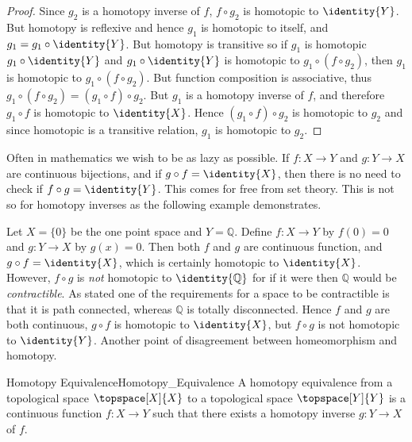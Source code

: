         \begin{proof}
            Since $g_{2}$ is a homotopy inverse of $f$,
            $f\circ{g}_{2}$ is homotopic to $\identity{Y}$. But homotopy
            is reflexive and hence $g_{1}$ is homotopic to itself, and
            $g_{1}=g_{1}\circ\identity{Y}$. But homotopy is transitive
            so if $g_{1}$ is homotopic $g_{1}\circ\identity{Y}$ and
            $g_{1}\circ\identity{Y}$ is homotopic to
            $g_{1}\circ(f\circ{g}_{2})$, then $g_{1}$ is homotopic to
            $g_{1}\circ(f\circ{g}_{2})$. But function composition is
            associative, thus
            $g_{1}\circ(f\circ{g}_{2})=(g_{1}\circ{f})\circ{g}_{2}$.
            But $g_{1}$ is a homotopy inverse of $f$, and therefore
            $g_{1}\circ{f}$ is homotopic to $\identity{X}$. Hence
            $(g_{1}\circ{f})\circ{g}_{2}$ is homotopic to ${g}_{2}$ and
            since homotopic is a transitive relation, $g_{1}$ is
            homotopic to ${g}_{2}$.
        \end{proof}
        Often in mathematics we wish to be as lazy as possible. If
        $f:X\rightarrow{Y}$ and $g:Y\rightarrow{X}$ are continuous
        bijections, and if $g\circ{f}=\identity{X}$, then there is no
        need to check if $f\circ{g}=\identity{Y}$. This comes for free
        from set theory. This is not so for homotopy inverses as the
        following example demonstrates.
        \begin{example}
            Let $X=\{0\}$ be the one point space and $Y=\mathbb{Q}$.
            Define $f:X\rightarrow{Y}$ by $f(0)=0$ and
            $g:Y\rightarrow{X}$ by $g(x)=0$. Then both $f$ and $g$ are
            continuous function, and $g\circ{f}=\identity{X}$, which is
            certainly homotopic to $\identity{X}$. However, $f\circ{g}$
            is \textit{not} homotopic to $\identity{\mathbb{Q}}$ for if
            it were then $\mathbb{Q}$ would be \textit{contractible}. As
            stated one of the requirements for a space to be contractible
            is that it is path connected, whereas $\mathbb{Q}$ is
            totally disconnected. Hence $f$ and $g$ are both continuous,
            $g\circ{f}$ is homotopic to $\identity{X}$, but
            $f\circ{g}$ is not homotopic to $\identity{Y}$. Another
            point of disagreement between homeomorphism and homotopy.
        \end{example}
        \begin{fdefinition}{Homotopy Equivalence}{Homotopy_Equivalence}
            A homotopy equivalence from a topological space
            $\topspace[X]{X}$ to a topological space $\topspace[Y]{Y}$
            is a continuous function $f:X\rightarrow{Y}$ such that there
            exists a homotopy inverse $g:Y\rightarrow{X}$ of $f$.
        \end{fdefinition}
